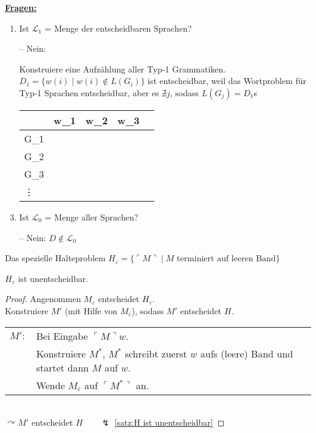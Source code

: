 \underline{\textbf{Fragen:}}
\begin{enumerate}
	\item Ist $\mathcal{L}_1$ = Menge der entscheidbaren Sprachen?
	\item[--] Nein:\\
	\begin{minipage}[t]{.7\linewidth}
	Konstruiere eine Aufzählung aller Typ-1 Grammatiken. \medskip\\
	$D_1 = \{w(i) \mid w(i)\notin L(G_i)\}$ ist entscheidbar, weil das Wortproblem für Typ-1 
	Sprachen entscheidbar, aber es $\nexists j$, sodass $L(G_j) = D_1$s
	\end{minipage}\quad
	\begin{tabular}[t]{M{c} | *4{M{c}@{ }}}
		\ &w_1&w_2&w_3&\cdots\\\hline
		G_1 &\\
		G_2 &\\
		G_3 &\\
		\vdots&
	\end{tabular}
	\item Ist $\mathcal{L}_0$ = Menge aller Sprachen?
	\item[--] Nein: $D \notin \mathcal{L}_0$
\end{enumerate}
\begin{Def}[name={[Spezielles Halteproblem $H_\varepsilon$]}]
	Das spezielle Halteproblem $H_\varepsilon = \{\ulcorner M\urcorner \mid M 
	\text{ terminiert auf leeren Band}\}$
\end{Def}
\begin{Satz}[name={[$H_\varepsilon$ ist unentscheidbar]}]
	$H_\varepsilon$ ist unentscheidbar.
\end{Satz}
\begin{proof}
	Angenommen $M_\varepsilon$ entscheidet $H_\varepsilon$.\\
	Konstruiere $M'$ (mit Hilfe von $M_\varepsilon$), sodass $M'$ entscheidet $H$.\\
	\begin{tabular}{r@{ }l}
	$M':$ & Bei Eingabe $\ulcorner M\urcorner w$.\\
	& Konstruiere $M^*$, $M^*$ schreibt zuerst $w$ aufs (leere) Band und 
	startet dann $M$ auf $w$.\\
	& Wende $M_\varepsilon$ auf $\ulcorner M^*\urcorner$ an.
	\end{tabular}\\
	$\curvearrowright M'$ entscheidet $H \qquad \lightning$ \autoref{satz:H ist unentscheidbar}
\end{proof}

